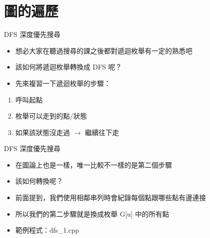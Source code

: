 \documentclass[aspectratio=169]{beamer}
\begin{document}
    \section{圖的遍歷}

    \begin{frame}{DFS 深度優先搜尋}
        \begin{itemize}
            \item<1-> 想必大家在聽過搜尋的課之後都對遞迴枚舉有一定的熟悉吧
            \item<2-> 該如何將遞迴枚舉轉換成 DFS 呢？
            \item<2-> 先來複習一下遞迴枚舉的步驟：
        \end{itemize}
        
        \begin{enumerate}
            \item<3-> 呼叫起點
            \item<4-> 枚舉可以走到的點/狀態
            \item<5-> 如果該狀態沒走過 $\rightarrow$ 繼續往下走
        \end{enumerate}
    \end{frame}

    \begin{frame}{DFS 深度優先搜尋}
        \begin{itemize}
            \item<1-> 在圖論上也是一樣，唯一比較不一樣的是第二個步驟
            \item<1-> 該如何轉換呢？
            \item<2-> 前面提到，我們使用相鄰串列時會紀錄每個點跟哪些點有邊連接
            \item<2-> 所以我們的第二步驟就是換成枚舉 G[u] 中的所有點
            \item<2-> 範例程式：dfs\_1.cpp
        \end{itemize}
    \end{frame}
\end{document}
